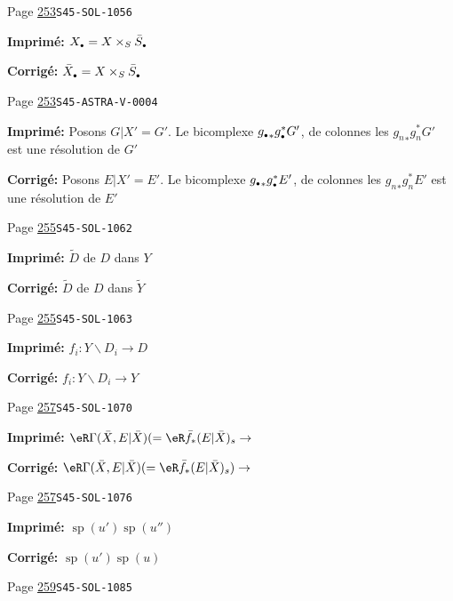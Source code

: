 \documentclass[oneside]{book}
\DeclareMathOperator{\spe}{sp} %
\renewcommand{\setminus}{\smallsetminus}
\theoremstyle{sga-source}
\theoremstyle{sga-source-dash}
\theoremstyle{sga-source-dotdash}
\theoremstyle{sga-source-number-note-dash}
\theoremstyle{sga-source-note-number-dotdash}
\theoremstyle{sga-source-example-dotdash}
\theoremstyle{sga-source-inline-number}
\theoremstyle{sga-source-bare-number}
\theoremstyle{sga-source}
\let\oldbullet\bullet
\renewcommand{\bullet}{\textnormal{\tiny$\oldbullet$}}
\begin{document}
\begin{description}
\smallskip
\item[\hypertarget{apparatus:FR-0263}{263}] Page \hyperlink{printpage:fr:253}{253}\quad\texttt{S45-SOL-1056}
\par\noindent\textbf{Imprimé:} \(X_\bullet=X\times_S \bar S_\bullet\)
\par\noindent\textbf{Corrigé:} \(\bar X_\bullet=X\times_S \bar S_\bullet\)
\smallskip
\item[\hypertarget{apparatus:FR-0264}{264}] Page \hyperlink{printpage:fr:253}{253}\quad\texttt{S45-ASTRA-V-0004}
\par\noindent\textbf{Imprimé:} Posons $G|X'=G'$. Le bicomplexe 
${g_\bullet}_\ast g_\bullet^\ast G'$, de colonnes les 
${g_n}_\ast g_n^\ast G'$ est une résolution de $G'$
\par\noindent\textbf{Corrigé:} Posons $E|X'=E'$. Le bicomplexe 
${g_\bullet}_\ast g_\bullet^\ast E'$, de colonnes les 
${g_n}_\ast g_n^\ast E'$ est une résolution de $E'$
\smallskip
\item[\hypertarget{apparatus:FR-0265}{265}] Page \hyperlink{printpage:fr:255}{255}\quad\texttt{S45-SOL-1062}
\par\noindent\textbf{Imprimé:} $\widetilde D$ de $D$ dans $Y$
\par\noindent\textbf{Corrigé:} $\widetilde D$ de $D$ dans $\widetilde Y$
\smallskip
\item[\hypertarget{apparatus:FR-0266}{266}] Page \hyperlink{printpage:fr:255}{255}\quad\texttt{S45-SOL-1063}
\par\noindent\textbf{Imprimé:} \(f_i:Y\setminus D_i \to D\)
\par\noindent\textbf{Corrigé:} \(f_i:Y\setminus D_i \to Y\)
\smallskip
\item[\hypertarget{apparatus:FR-0267}{267}] Page \hyperlink{printpage:fr:257}{257}\quad\texttt{S45-SOL-1070}
\par\noindent\textbf{Imprimé:} \(\eR\Gamma(\bar X,E|\bar X) (=\eR\bar f_\ast (E|\bar X)_s \to\)
\par\noindent\textbf{Corrigé:} \(\eR\Gamma(\bar X,E|\bar X) (=\eR\bar f_\ast (E|\bar X)_s) \to\)
\smallskip
\item[\hypertarget{apparatus:FR-0268}{268}] Page \hyperlink{printpage:fr:257}{257}\quad\texttt{S45-SOL-1076}
\par\noindent\textbf{Imprimé:} \(\spe(u')\spe(u'')\)
\par\noindent\textbf{Corrigé:} \(\spe(u')\spe(u)\)
\smallskip
\item[\hypertarget{apparatus:FR-0269}{269}] Page \hyperlink{printpage:fr:259}{259}\quad\texttt{S45-SOL-1085}

\end{description}
\end{document}
